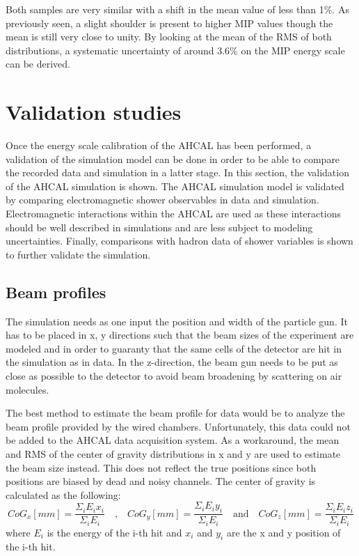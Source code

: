 Both samples are very similar with a shift in the mean value of less than 1\%. As previously seen, a slight shoulder is present to higher MIP values though the mean is still very close to unity. By looking at the mean of the RMS of both distributions, a systematic uncertainty of around 3.6\% on the MIP energy scale can be derived.

\section{Validation studies}
\label{appendix:SimulationVal}

Once the energy scale calibration of the AHCAL has been performed, a validation of the simulation model can be done in order to be able to compare the recorded data and simulation in a latter stage.
In this section, the validation of the AHCAL simulation is shown. The AHCAL simulation model is validated by comparing electromagnetic shower observables in data and simulation. Electromagnetic interactions within the AHCAL are used as these interactions should be well described in simulations and are less subject to modeling uncertainties. Finally, comparisons with hadron data of shower variables is shown to further validate the simulation.

\subsection{Beam profiles}

The simulation needs as one input the position and width of the particle gun. It has to be placed in x, y directions such that the beam sizes of the experiment are modeled and in order to guaranty that the same cells of the detector are hit in the simulation as in data. In the z-direction, the beam gun needs to be put as close as possible to the detector to avoid beam broadening by scattering on air molecules.

The best method to estimate the beam profile for data would be to analyze the beam profile provided by the wired chambers. Unfortunately, this data could not be added to the AHCAL data acquisition system. As a workaround, the mean and RMS of the center of gravity distributions in x and y are used to estimate the beam size instead. This does not reflect the true positions since both positions are biased by dead and noisy channels. The center of gravity is calculated as the following:
\begin{equation}
	CoG_x [mm] = \frac{\Sigma_i E_i x_i}{\Sigma_i E_i} \quad \text{,} \quad CoG_y [mm] = \frac{\Sigma_i E_i y_i}{\Sigma_i E_i} \quad \text{and} \quad CoG_z [mm] = \frac{\Sigma_i E_i z_i}{\Sigma_i E_i}
\end{equation}
where $E_i$ is the energy of the i-th hit and $x_i$ and $y_i$ are the x and y position of the i-th hit.

